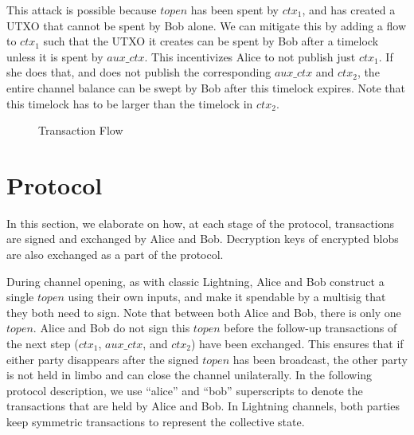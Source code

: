 This attack is possible because $topen$ has been spent by $\mathit{ctx_1}$, and has created a UTXO that cannot be spent by Bob alone. We can mitigate this by adding a flow to $\mathit{ctx_1}$ such that the UTXO it creates can be spent by Bob after a timelock unless it is spent by $\mathit{aux\_ctx}$. This incentivizes Alice to not publish just $\mathit{ctx_1}$. If she does that, and does not publish the corresponding $\mathit{aux\_ctx}$ and $\mathit{ctx_2}$, the entire channel balance can be swept by Bob after this timelock expires. Note that this timelock has to be larger than the timelock in $\mathit{ctx_2}$. 

\begin{figure}[H]
\caption{Transaction Flow}
\label{transaction_flow}
\end{figure}

\section{Protocol} \label{protocol}
In this section, we elaborate on how, at each stage of the protocol, transactions are signed and exchanged by Alice and Bob. Decryption keys of encrypted blobs are also exchanged as a part of the protocol.

During channel opening, as with classic Lightning, Alice and Bob construct a single $\mathit{topen}$ using their own inputs, and make it spendable by a multisig that they both need to sign. Note that between both Alice and Bob, there is only one $\mathit{topen}$. Alice and Bob do not sign this $\mathit{topen}$ before the follow-up transactions of the next step ($\mathit{ctx_1}$, $\mathit{aux\_ctx}$, and $\mathit{ctx_2}$) have been exchanged. This ensures that if either party disappears after the signed $\mathit{topen}$ has been broadcast, the other party is not held in limbo and can close the channel unilaterally. In the following protocol description, we use ``alice'' and ``bob'' superscripts to denote the transactions that are held by Alice and Bob. In Lightning channels, both parties keep symmetric transactions to represent the collective state. 

